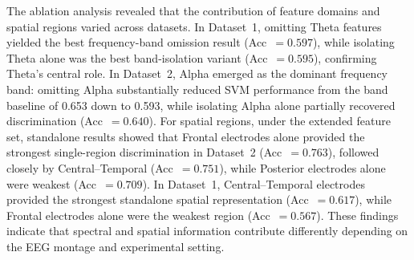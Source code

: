\documentclass[conference]{IEEEtran}
\begin{document}
The ablation analysis revealed that the contribution of feature domains and spatial regions varied across datasets. In Dataset~1, omitting Theta features yielded the best frequency-band omission result (Acc~$=0.597$), while isolating Theta alone was the best band-isolation variant (Acc~$=0.595$), confirming Theta's central role. In Dataset~2, Alpha emerged as the dominant frequency band: omitting Alpha substantially reduced SVM performance from the band baseline of 0.653 down to 0.593, while isolating Alpha alone partially recovered discrimination (Acc~$=0.640$). For spatial regions, under the extended feature set, standalone results showed that Frontal electrodes alone provided the strongest single-region discrimination in Dataset~2 (Acc~$=0.763$), followed closely by Central--Temporal (Acc~$=0.751$), while Posterior electrodes alone were weakest (Acc~$=0.709$). In Dataset~1, Central--Temporal electrodes provided the strongest standalone spatial representation (Acc~$=0.617$), while Frontal electrodes alone were the weakest region (Acc~$=0.567$). These findings indicate that spectral and spatial information contribute differently depending on the EEG montage and experimental setting.


\end{document}
